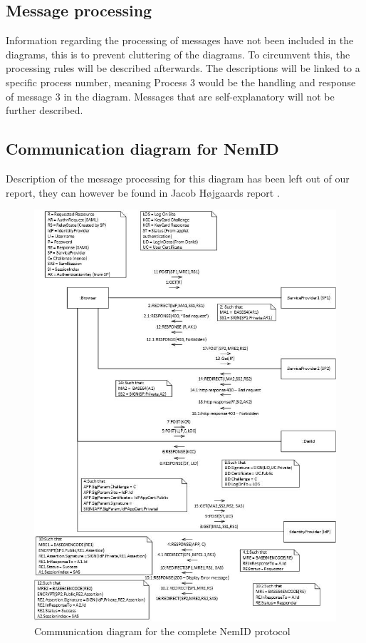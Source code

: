 \documentclass[twosided]{report}
\begin{document}
\subsection{Message processing}
Information regarding the processing of messages have not been included in the diagrams, this is to prevent cluttering of the diagrams. To circumvent this, the processing rules will be described afterwards. The descriptions will be linked to a specific process number, meaning Process 3 would be the handling and response of message 3 in the diagram. Messages that are self-explanatory will not be further described.

\subsection{Communication diagram for NemID}
Description of the message processing for this diagram has been left out of our report, they can however be found in Jacob H{\o}jgaards report \cite{jacob}.

\begin{figure}[H]
	\centering
	\includegraphics{images/Communication-Jacob.jpg}
	\caption{Communication diagram for the complete NemID protocol \cite{jacob}}
	\label{fig:jacobCommunication}
\end{figure}
\end{document}
